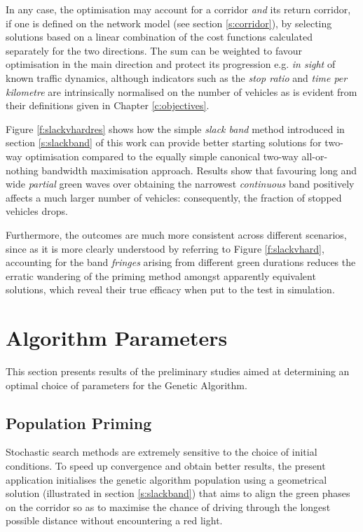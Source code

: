 In any case, the optimisation may account for a corridor \emph{and} its return corridor, if one is defined on the network model (see section \ref{s:corridor}), by selecting solutions based on a linear combination of the cost functions calculated separately for the two directions. The sum can be weighted to favour optimisation in the main direction and protect its progression e.g. \emph{in sight} of known traffic dynamics, although indicators such as the \emph{stop ratio} and \emph{time per kilometre} are intrinsically normalised on the number of vehicles as is evident from their definitions given in Chapter \ref{c:objectives}.

Figure \ref{f:slackvhardres} shows how the simple \emph{slack band} method introduced in section \ref{s:slackband} of this work can provide better starting solutions for two-way optimisation compared to the equally simple canonical two-way all-or-nothing bandwidth maximisation approach.
Results show that favouring long and wide \emph{partial} green waves over obtaining the narrowest \emph{continuous} band positively affects a much larger number of vehicles: consequently, the fraction of stopped vehicles drops.

Furthermore, the outcomes are much more consistent across different scenarios, since as it is more clearly understood by referring to Figure \ref{f:slackvhard}, accounting for the band \emph{fringes} arising from different green durations reduces the erratic wandering of the priming method amongst apparently equivalent solutions, which reveal their true efficacy when put to the test in simulation.


\pagebreak
\section{Algorithm Parameters}
This section presents results of the preliminary studies aimed at determining an optimal choice of parameters for the Genetic Algorithm.

\subsection{Population Priming} \label{s:poppriming}
Stochastic search methods are extremely sensitive to the choice of initial conditions. To speed up convergence and obtain better results, the present application initialises the genetic algorithm population using a geometrical solution (illustrated in section \ref{s:slackband}) that aims to align the green phases on the corridor so as to maximise the chance of driving through the longest possible distance without encountering a red light.

